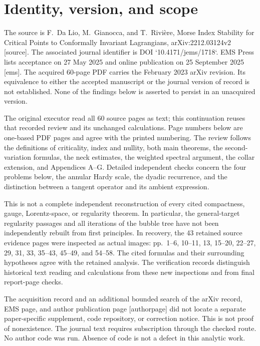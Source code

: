 \documentclass[10pt]{article}
\begin{document}
\section*{Identity, version, and scope}
The source is F. Da Lio, M. Gianocca, and T. Rivière, Morse Index Stability for Critical Points to Conformally Invariant Lagrangians, arXiv:2212.03124v2 [source]. The associated journal identifier is DOI `10.4171/jems/1718`. EMS Press lists acceptance on 27 May 2025 and online publication on 25 September 2025 [ems]. The acquired 60-page PDF carries the February 2023 arXiv revision. Its equivalence to either the accepted manuscript or the journal version of record is not established. None of the findings below is asserted to persist in an unacquired version.\par
The original executor read all 60 source pages as text; this continuation reuses that recorded review and its unchanged calculations. Page numbers below are one-based PDF pages and agree with the printed numbering. The review follows the definitions of criticality, index and nullity, both main theorems, the second-variation formulas, the neck estimates, the weighted spectral argument, the collar extension, and Appendices A–G. Detailed independent checks concern the four problems below, the annular Hardy scale, the dyadic recurrence, and the distinction between a tangent operator and its ambient expression.\par
This is not a complete independent reconstruction of every cited compactness, gauge, Lorentz-space, or regularity theorem. In particular, the general-target regularity passages and all iterations of the bubble tree have not been independently rebuilt from first principles. In recovery, the 43 retained source evidence pages were inspected as actual images: pp. 1–6, 10–11, 13, 15–20, 22–27, 29, 31, 33, 35–43, 45–49, and 54–58. The cited formulas and their surrounding hypotheses agree with the retained analysis. The verification records distinguish historical text reading and calculations from these new inspections and from final report-page checks.\par
The acquisition record and an additional bounded search of the arXiv record, EMS page, and author publication page [authorpage] did not locate a separate paper-specific supplement, code repository, or correction notice. This is not proof of nonexistence. The journal text requires subscription through the checked route. No author code was run. Absence of code is not a defect in this analytic work.\par
\end{document}
